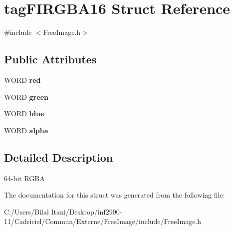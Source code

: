 \hypertarget{structtag_f_i_r_g_b_a16}{}\section{tag\+F\+I\+R\+G\+B\+A16 Struct Reference}
\label{structtag_f_i_r_g_b_a16}


{\ttfamily \#include $<$Free\+Image.\+h$>$}

\subsection*{Public Attributes}
\begin{DoxyCompactItemize}
\item 
W\+O\+RD {\bfseries red}\hypertarget{structtag_f_i_r_g_b_a16_a580143c8b2f5e28721972342a6facd01}{}\label{structtag_f_i_r_g_b_a16_a580143c8b2f5e28721972342a6facd01}

\item 
W\+O\+RD {\bfseries green}\hypertarget{structtag_f_i_r_g_b_a16_a0ae72ef6b7fe786b9ea6068579cd3f2d}{}\label{structtag_f_i_r_g_b_a16_a0ae72ef6b7fe786b9ea6068579cd3f2d}

\item 
W\+O\+RD {\bfseries blue}\hypertarget{structtag_f_i_r_g_b_a16_afe4aa863b00988ad24831a1432ef837e}{}\label{structtag_f_i_r_g_b_a16_afe4aa863b00988ad24831a1432ef837e}

\item 
W\+O\+RD {\bfseries alpha}\hypertarget{structtag_f_i_r_g_b_a16_a9875250254b19efbfb321bf33ae2fdf6}{}\label{structtag_f_i_r_g_b_a16_a9875250254b19efbfb321bf33ae2fdf6}

\end{DoxyCompactItemize}


\subsection{Detailed Description}
64-\/bit R\+G\+BA 

The documentation for this struct was generated from the following file\+:\begin{DoxyCompactItemize}
\item 
C\+:/\+Users/\+Bilal Itani/\+Desktop/inf2990-\/11/\+Cadriciel/\+Commun/\+Externe/\+Free\+Image/include/Free\+Image.\+h\end{DoxyCompactItemize}
